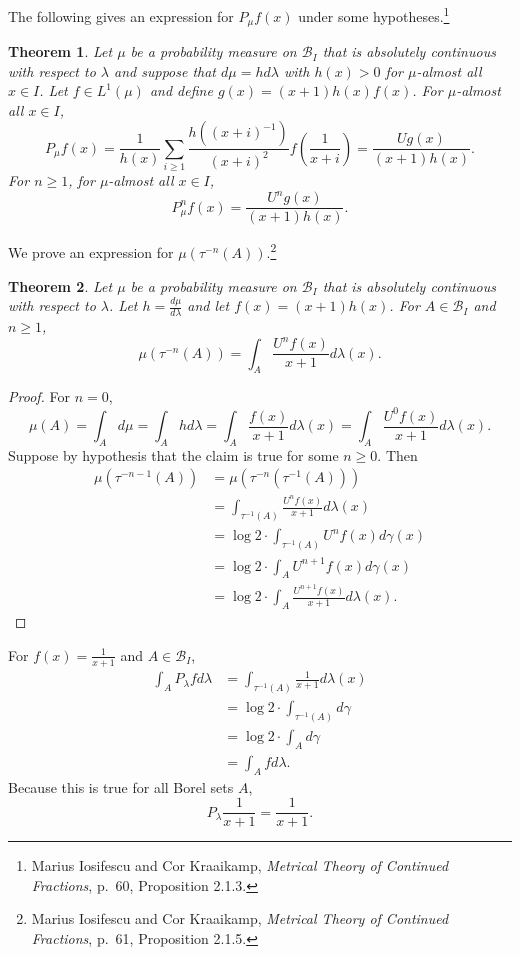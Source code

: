 \documentclass{article}
\newtheorem{theorem}{Theorem}
\theoremstyle{definition}
\begin{document}
The following gives an expression for $P_\mu f(x)$ under some hypotheses.\footnote{Marius Iosifescu and Cor Kraaikamp,
{\em Metrical Theory of Continued Fractions}, p.~60, Proposition 2.1.3.}

\begin{theorem}
Let $\mu$ be a probability measure on $\mathscr{B}_I$ that is absolutely continuous with respect
to $\lambda$ and suppose that $d\mu = h d\lambda$ with $h(x)>0$ for $\mu$-almost all $x \in I$. Let
$f \in L^1(\mu)$ and define $g(x)=(x+1)h(x)f(x)$. 
For $\mu$-almost all $x \in I$,
\[
P_\mu f(x) = \frac{1}{h(x)} \sum_{i \geq 1} \frac{h((x+i)^{-1})}{(x+i)^2} f\left(\frac{1}{x+i}\right)
=\frac{Ug(x)}{(x+1)h(x)}.
\]
For $n \geq 1$, for $\mu$-almost all $x \in I$,
\[
P_\mu^n f(x) = \frac{U^n g(x)}{(x+1)h(x)}.
\]
\label{Pmu}
\end{theorem}



We prove an expression for $\mu(\tau^{-n}(A))$.\footnote{Marius Iosifescu and Cor Kraaikamp,
{\em Metrical Theory of Continued Fractions}, p.~61, Proposition 2.1.5.}

\begin{theorem}
Let $\mu$ be a probability measure on $\mathscr{B}_I$ that is absolutely continuous with respect
to $\lambda$. Let $h = \frac{d\mu}{d\lambda}$ and let $f(x)=(x+1)h(x)$. For $A \in \mathscr{B}_I$
and $n \geq 1$,
\[
\mu(\tau^{-n}(A)) = \int_A \frac{U^n f(x)}{x+1} d\lambda(x).
\]
\end{theorem}
\begin{proof}
For $n=0$, 
\[
\mu(A) =  \int_A d\mu = 
 \int_A h d\lambda =
\int_A \frac{f(x)}{x+1} d\lambda(x)=\int_A \frac{U^0 f(x)}{x+1} d\lambda(x).
\]
Suppose by hypothesis that the claim is true for some $n \geq 0$.
Then 
\begin{align*}
\mu(\tau^{-n-1}(A))&=\mu(\tau^{-n}(\tau^{-1}(A)))\\
&=\int_{\tau^{-1}(A)} \frac{U^n f(x)}{x+1} d\lambda(x)\\
&=\log 2\cdot \int_{\tau^{-1}(A)} U^n f(x) d\gamma(x)\\
&=\log 2\cdot \int_A U^{n+1}f(x) d\gamma(x)\\
&=\log 2\cdot \int_A \frac{U^{n+1} f(x)}{x+1} d\lambda(x).
\end{align*}
\end{proof}


For $f(x)=\frac{1}{x+1}$ and $A \in \mathscr{B}_I$,
\begin{align*}
\int_A P_\lambda f d\lambda&=\int_{\tau^{-1}(A)} \frac{1}{x+1} d\lambda(x)\\
&=\log 2 \cdot \int_{\tau^{-1}(A)} d\gamma\\
&=\log 2 \cdot \int_A d\gamma\\
&= \int_A f d\lambda.
\end{align*}
Because this is true for all Borel sets $A$,
\[
P_\lambda \frac{1}{x+1} = \frac{1}{x+1}.
\]
\end{document}

